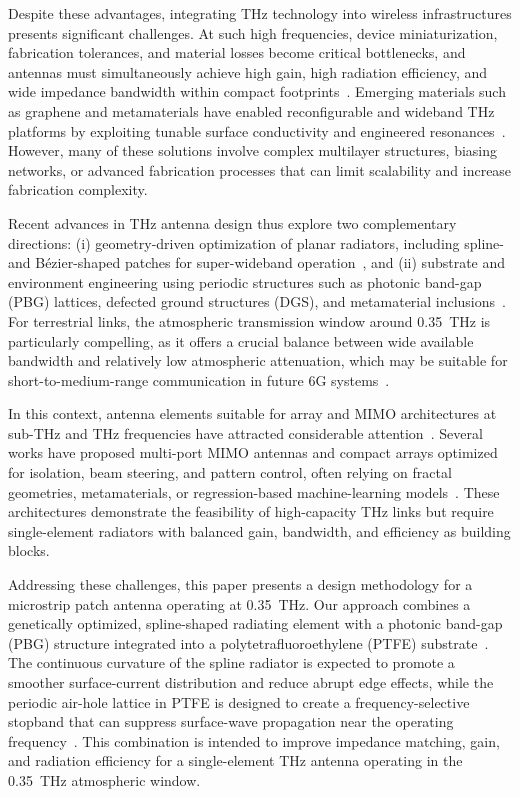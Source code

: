 \documentclass[draft]{agujournal2019}
\begin{document}
Despite these advantages, integrating THz technology into wireless infrastructures presents significant challenges. At such high frequencies, device miniaturization, fabrication tolerances, and material losses become critical bottlenecks, and antennas must simultaneously achieve high gain, high radiation efficiency, and wide impedance bandwidth within compact footprints~\cite{ullah_thz_2019}. Emerging materials such as graphene and metamaterials have enabled reconfigurable and wideband THz platforms by exploiting tunable surface conductivity and engineered resonances~\cite{moradi_graphene_2021,krishna_graphene_2023}. However, many of these solutions involve complex multilayer structures, biasing networks, or advanced fabrication processes that can limit scalability and increase fabrication complexity.

Recent advances in THz antenna design thus explore two complementary directions: (i) geometry-driven optimization of planar radiators, including spline- and Bézier-shaped patches for super-wideband operation~\cite{marouf_bezier_2023}, and (ii) substrate and environment engineering using periodic structures such as photonic band-gap (PBG) lattices, defected ground structures (DGS), and metamaterial inclusions~\cite{khezzar_pbg_2021,ullah_thz_2019,temmar_bspo_2019,devapriya_metamaterial_2019}. For terrestrial links, the atmospheric transmission window around 0.35~THz is particularly compelling, as it offers a crucial balance between wide available bandwidth and relatively low atmospheric attenuation, which may be suitable for short-to-medium-range communication in future 6G systems~\cite{strinati_6g_2019,khezzar_pbg_2021}.

In this context, antenna elements suitable for array and MIMO architectures at sub-THz and THz frequencies have attracted considerable attention~\cite{mousa_ebg_2026,li_triband_2024,nirob_grid_2025}. Several works have proposed multi-port MIMO antennas and compact arrays optimized for isolation, beam steering, and pattern control, often relying on fractal geometries, metamaterials, or regression-based machine-learning models~\cite{panda_fractal_2025,devapriya_metamaterial_2019,krishna_rhombus_2021}. These architectures demonstrate the feasibility of high-capacity THz links but require single-element radiators with balanced gain, bandwidth, and efficiency as building blocks.

Addressing these challenges, this paper presents a design methodology for a microstrip patch antenna operating at 0.35~THz. Our approach combines a genetically optimized, spline-shaped radiating element with a photonic band-gap (PBG) structure integrated into a polytetrafluoroethylene (PTFE) substrate~\cite{john_spline_monopole_2007,khezzar_pbg_2021}. The continuous curvature of the spline radiator is expected to promote a smoother surface-current distribution and reduce abrupt edge effects, while the periodic air-hole lattice in PTFE is designed to create a frequency-selective stopband that can suppress surface-wave propagation near the operating frequency~\cite{temmar_bspo_2019,kushwaha_photonic_2018}. This combination is intended to improve impedance matching, gain, and radiation efficiency for a single-element THz antenna operating in the 0.35~THz atmospheric window.
\end{document}
